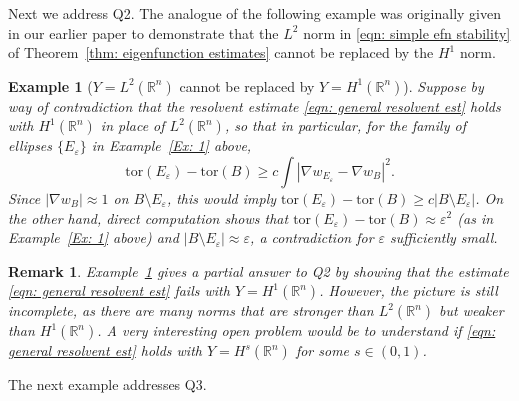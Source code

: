 \documentclass[10pt, reqno]{amsart}
\numberwithin{equation}{section}
\newtheorem{remark}[theorem]{Remark}
\newtheorem{example}[theorem]{Example}
\def\R{{\mathbb R}}
\def\e{\varepsilon}
\def\tor{\mathrm{tor}}
\begin{document}
Next we address Q2.  The analogue of the following example was originally given in our earlier paper \cite{AKN2} to demonstrate that the $L^2$ norm in \eqref{eqn: simple efn stability} of Theorem~\ref{thm: eigenfunction estimates} cannot be replaced by the $H^1$ norm. 
\begin{example}[$Y=L^2(\R^n)$ cannot be replaced by $Y = H^1(\R^n)$]
   \label{Ex: 2} {\rm
   Suppose by way of contradiction that the resolvent estimate \eqref{eqn: general resolvent est} holds with $H^1(\R^n)$ in place of $L^2(\R^n)$, so that in particular, for the family of ellipses $\{E_\e\}$ in Example~\ref{Ex: 1} above, 
    \[
    \tor(E_\e )- \tor(B) \geq c \int | \nabla w_{E_\e} - \nabla w_{B}|^2.
    \]
    Since $|\nabla w_B| \approx 1$ on $B\setminus E_\e$, this would imply $\tor(E_\e )- \tor(B) \geq c |B\setminus E_\e|$. On the other hand, direct computation shows that $\tor(E_\e )- \tor(B) \approx \e^2$ (as in Example~\ref{Ex: 1} above) and $|B\setminus E_\e| \approx \e$, a contradiction for $\e$ sufficiently small.
    }
\end{example}
\begin{remark}
    {\rm 
    Example~\ref{Ex: 2} gives a partial answer to Q2 by showing that the estimate \eqref{eqn: general resolvent est} {\it fails} with $Y = H^1(\R^n)$. However, the picture is still incomplete, as there are many norms that are stronger than $L^2(\R^n)$ but weaker than $H^1(\R^n)$. A very interesting open problem would be to understand if \eqref{eqn: general resolvent est} holds with $Y = H^s(\R^n)$ for some $s \in (0,1)$. 
    }
\end{remark}

The next example addresses Q3. 
\end{document}
